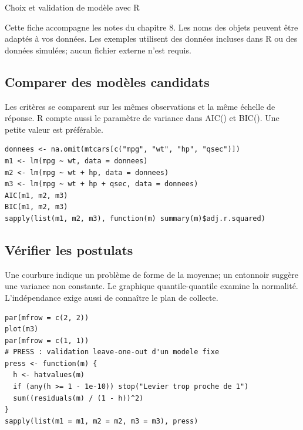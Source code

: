 \documentclass[letterpaper,11pt]{article}
\begin{document}
\begin{center}{\Large Choix et validation de modèle avec R}\end{center}
Cette fiche accompagne les notes du chapitre 8. Les noms des objets peuvent être adaptés à vos données. Les exemples utilisent des données incluses dans R ou des données simulées; aucun fichier externe n’est requis.

\par\medskip\noindent\begin{minipage}{\linewidth}
\subsection*{Comparer des modèles candidats}
Les critères se comparent sur les mêmes observations et la même échelle de réponse. R compte aussi le paramètre de variance dans AIC() et BIC(). Une petite valeur est préférable.
\begin{Verbatim}
donnees <- na.omit(mtcars[c("mpg", "wt", "hp", "qsec")])
m1 <- lm(mpg ~ wt, data = donnees)
m2 <- lm(mpg ~ wt + hp, data = donnees)
m3 <- lm(mpg ~ wt + hp + qsec, data = donnees)
AIC(m1, m2, m3)
BIC(m1, m2, m3)
sapply(list(m1, m2, m3), function(m) summary(m)$adj.r.squared)
\end{Verbatim}

\end{minipage}\par
\par\medskip\noindent\begin{minipage}{\linewidth}
\subsection*{Vérifier les postulats}
Une courbure indique un problème de forme de la moyenne; un entonnoir suggère une variance non constante. Le graphique quantile-quantile examine la normalité. L'indépendance exige aussi de connaître le plan de collecte.
\begin{Verbatim}
par(mfrow = c(2, 2))
plot(m3)
par(mfrow = c(1, 1))
# PRESS : validation leave-one-out d'un modele fixe
press <- function(m) {
  h <- hatvalues(m)
  if (any(h >= 1 - 1e-10)) stop("Levier trop proche de 1")
  sum((residuals(m) / (1 - h))^2)
}
sapply(list(m1 = m1, m2 = m2, m3 = m3), press)
\end{Verbatim}

\end{minipage}\par
\end{document}
